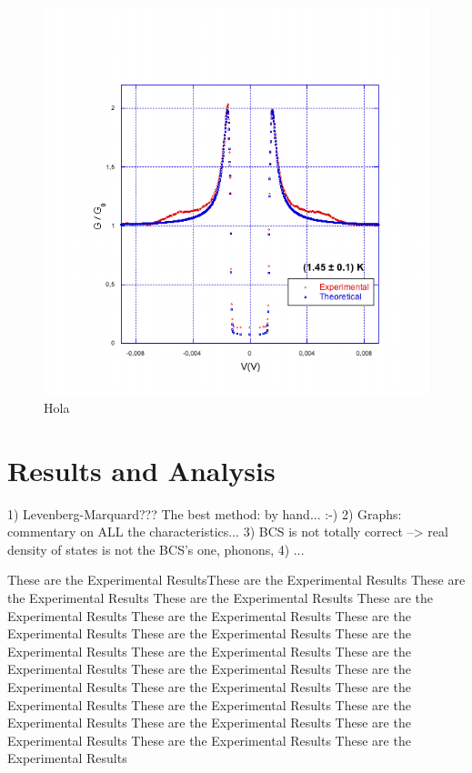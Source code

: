 \documentclass[twocolumn, twoside,a4paper,10pt]{article}
\begin{document}
\begin{figure}[h!]
\centering
\includegraphics[scale=0.4]{graph5}
\caption{Hola\label{graph5}}
\end{figure}



\section{Results and Analysis}

1) Levenberg-Marquard??? The best method: by hand... :-)
2) Graphs: commentary on ALL the characteristics...
3) BCS is not totally correct --> real density of states is not the BCS's one, phonons,
4) ...


These are the Experimental ResultsThese are the Experimental Results These are the Experimental Results These are the Experimental Results These are the Experimental Results These are the Experimental Results These are the Experimental Results These are the Experimental Results These are the Experimental Results These are the Experimental Results These are the Experimental Results These are the Experimental Results These are the Experimental Results These are the Experimental Results These are the Experimental Results These are the Experimental Results These are the Experimental Results These are the Experimental Results These are the Experimental Results These are the Experimental Results These are the Experimental Results 
\end{document}
